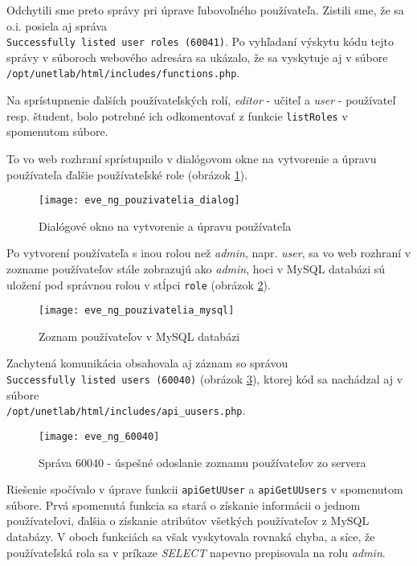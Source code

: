 Odchytili sme preto správy pri úprave ľubovoľného používateľa. Zistili sme, že sa o.i. posiela aj správa \\
\texttt{Successfully listed user roles (60041)}. Po vyhľadaní výskytu kódu tejto správy v súboroch webového adresára sa ukázalo, že sa vyskytuje aj v súbore \\
\texttt{/opt/unetlab/html/includes/functions.php}.

Na sprístupnenie ďalších používateľských rolí, \emph{editor} - učiteľ a \emph{user} - používateľ resp. študent, bolo potrebné ich odkomentovať z funkcie \texttt{listRoles} v spomenutom súbore.

To vo web rozhraní sprístupnilo v dialógovom okne na vytvorenie a úpravu používateľa ďalšie používateľské role (obrázok \ref{obr:eve_ng_pouzivatelia_dialog}).

\begin{figure}
    \centering
    \texttt{[image: eve\_ng\_pouzivatelia\_dialog]}
    \caption{Dialógové okno na vytvorenie a úpravu používateľa}
    \label{obr:eve_ng_pouzivatelia_dialog}
\end{figure}

Po vytvorení používateľa s inou rolou než \emph{admin}, napr. \emph{user}, sa vo web rozhraní v zozname používateľov stále zobrazujú ako \emph{admin}, hoci v MySQL databázi sú uložení pod správnou rolou v stĺpci \texttt{role} (obrázok \ref{obr:eve_ng_pouzivatelia_mysql}).

\begin{figure}
    \centering
    \texttt{[image: eve\_ng\_pouzivatelia\_mysql]}
    \caption{Zoznam používateľov v MySQL databázi}
    \label{obr:eve_ng_pouzivatelia_mysql}
\end{figure}

Zachytená komunikácia obsahovala aj záznam so správou \\
\texttt{Successfully listed users (60040)} (obrázok \ref{obr:eve_ng_60040}),
ktorej kód sa nachádzal aj v súbore \\
\texttt{/opt/unetlab/html/includes/api\_uusers.php}.

\begin{figure}
    \centering
    \texttt{[image: eve\_ng\_60040]}
    \caption{Správa 60040 - úspešné odoslanie zoznamu používateľov zo servera}
    \label{obr:eve_ng_60040}
\end{figure}

Riešenie spočívalo v úprave funkcii \texttt{apiGetUUser} a \texttt{apiGetUUsers} v spomenutom súbore. Prvá spomenutá funkcia sa stará o získanie informácii o jednom používateľovi, ďalšia o získanie atribútov všetkých používateľov z MySQL databázy. V oboch funkciách sa však vyskytovala rovnaká chyba, a síce, že používateľská rola sa v príkaze \emph{SELECT} napevno prepisovala na rolu \emph{admin}.

